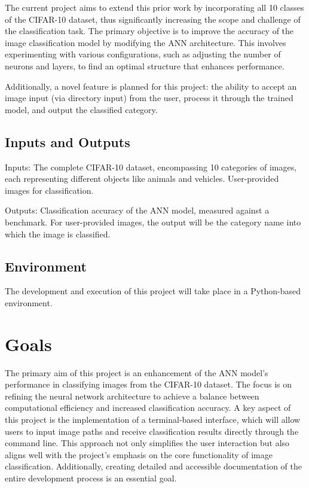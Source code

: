 \documentclass{article}
\begin{document}
The current project aims to extend this prior work by incorporating all 10 classes of the 
CIFAR-10 dataset, thus significantly increasing the scope and challenge of the classification task. 
The primary objective is to improve the accuracy of the image classification model by modifying the 
ANN architecture. This involves experimenting with various configurations, such as adjusting the number 
of neurons and layers, to find an optimal structure that enhances performance.

Additionally, a novel feature is planned for this project: the ability to accept an image input 
(via directory input) from the user, process it through the trained model, and output the classified category. 


\subsection{Inputs and Outputs}

Inputs: The complete CIFAR-10 dataset, encompassing 10 categories of images, each representing different 
objects like animals and vehicles. User-provided images for classification.

Outputs: Classification accuracy of the ANN model, measured against a benchmark. For user-provided images, 
the output will be the category name into which the image is classified.


\subsection{Environment}

The development and execution of this project will take place in a Python-based environment. 


\section{Goals}

The primary aim of this project is an enhancement of the ANN model's performance in 
classifying images from the CIFAR-10 dataset. The focus is on refining the neural network 
architecture to achieve a balance between computational efficiency and increased classification accuracy. 
A key aspect of this project is the implementation of a terminal-based interface, which will allow users 
to input image paths and receive classification results directly through the command line. This approach 
not only simplifies the user interaction but also aligns well with the project's emphasis on the core 
functionality of image classification. Additionally, creating detailed and accessible documentation of 
the entire development process is an essential goal.
\end{document}
